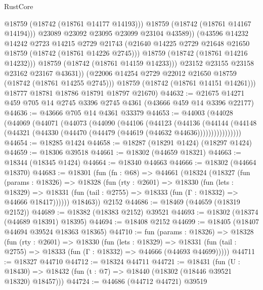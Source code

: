 \begin{lexlean}{RustCore}
\begin{coremodule}
                      @18759
                      (@18742 (@18761 @14177 @14193)))
                    @18759
                    (@18742 (@18761 @14167 @14194)))
                  @23089
                  @23092
                  @23095
                  @23099
                  @23104
                  @43589))
              (@43596
                @14232
                @14242
                @2723
                @14215
                @2729
                @21743
                (@21640 @14225 @2729 @21648 @21650 @18759 (@18742 (@18761 @14226 @2745)))
                @18759
                (@18742 (@18761 @14216 @14232)))
              @18759
              (@18742 (@18761 @14159 @14233)))
            @23152
            @23155
            @23158
            @23162
            @23167
            @43631))
        (@22006 @14254 @2729 @22012 @21650 @18759 (@18742 (@18761 @14255 @2745)))
        @18759
        (@18742 (@18761 @14151 @14261)))
      @18777
      @18781
      @18786
      @18791
      @18797
      @21670)
@44632 := @21675 @14271 @459 @705 @14 @2745 @3396 @2745 @4361 (@43666 @459 @14 @3396 @22177)
@44636 := @43666 @705 @14 @4361 @33379
@44653 := @44003
    (@44028
      (@44069
        (@44071
          (@44073
            (@44090
              (@44106
                (@44123
                  (@44136
                    (@44144
                      (@44148 (@44321 (@44330 (@44470 (@44479 (@44619 (@44632 @44636))))))))))))))))
@44654 := @18285 @1424
@44658 := @18287 (@18291 @1424) (@18297 @1424)
@44659 := @18306 @39518
@44661 := @18302 (@44659 @18321)
@44663 := @18344 (@18345 @1424)
@44664 := @18340 @44663
@44666 := @18302 (@44664 @18370)
@44683 := @18301
    (fun (fn : @68) =>
    @44661
      (@18324
        (@18327
          (fun (params : @18326) =>
          @18328
            (fun (rty : @2601) =>
            @18330
              (fun (lets : @18329) =>
              @18331 (fun (tail : @2755) => @18333 (fun (Γ : @18332) => @44666 @18417))))))
        @18463))
    @2152
@44686 := @18469 (@44659 (@18319 @2152))
@44689 := @18382 (@18383 @2152) @39521
@44693 := @18302 (@18374 (@44689 @18391) @18395)
@44694 := @18408 @2152
@44699 := @18405 (@18407 @44694 @39524 @18363 @18365)
@44710 := fun (params : @18326) =>
  @18328
    (fun (rty : @2601) =>
    @18330
      (fun (lets : @18329) =>
      @18331 (fun (tail : @2755) => @18333 (fun (Γ : @18332) => @44666 (@44693 @44699)))))
@44711 := @18327 @44710
@44712 := @18324 @44711
@44721 := @18431
    (fun (U : @18430) => @18432 (fun (t : @7) => @18440 (@18302 (@18446 @39521 @18320) @18457)))
@44724 := @44686 (@44712 @44721) @39519

\end{coremodule}
\end{lexlean}
